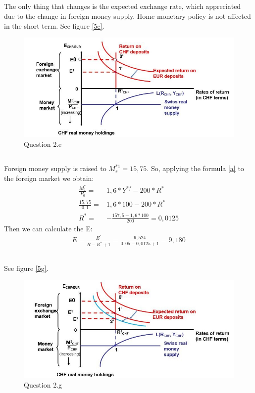 \documentclass[	11pt, ]{fphw}
\begin{document}
\subsection{}
The only thing that changes is the expected exchange rate, which appreciated due to the change in foreign money supply. Home monetary policy is not affected in the short term.  See figure \vref{5e}.
\begin{figure}[h] 
\centering 
\includegraphics[scale=0.6]{5e.JPG} 
\caption{Question 2.e} 
\label{5e}
\end{figure}

\subsection{}
Foreign money supply is raised to $M^{*1}_{s}=15,75$. So, applying the formula \ref{a} to the foreign market we obtain:
\begin{align}
    \frac{M^{*}_{1}}{P_{0}}= &1,6* Y^{*f}-200*R^{*} \\
    \frac{15,75}{0,1}= &1,6* 100-200*R^{*} \\
    R^{*}=& -\frac{157,5-1,6*100}{200}=0,0125
\end{align}
Then we can calculate the E:
\begin{align}
    E=\frac{E^{e}}{R-R^{*}+1}=\frac{9,524}{0,05-0,0125+1}=9,180
\end{align}

\subsection{}  %
See figure \vref{5g}.
\begin{figure}[h!] 
\centering 
\includegraphics[scale=0.7]{5f.JPG} 
\caption{Question 2.g} 
\label{5g}
\end{figure}
\end{document}
